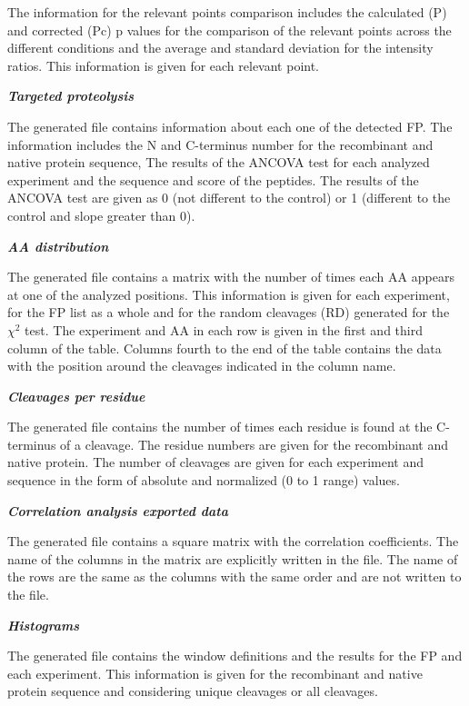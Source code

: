 The information for the relevant points comparison includes the calculated (P) and corrected (Pc) p values for the comparison of the relevant points across the different conditions and the average and standard deviation for the intensity ratios. This information is given for each relevant point.

\textit{\textbf{Targeted proteolysis}} 

The generated file contains information about each one of the detected FP. The information includes the N and C-terminus number for the recombinant and native protein sequence, The results of the ANCOVA test for each analyzed experiment and the sequence and score of the peptides. The results of the ANCOVA test are given as 0 (not different to the control) or 1 (different to the control and slope greater than 0).

\textit{\textbf{AA distribution}}

The generated file contains a matrix with the number of times each AA appears at one of the analyzed positions. This information is given for each experiment, for the FP list as a whole and for the random cleavages (RD) generated for the $\chi^2$ test. The experiment and AA in each row is given in the first and third column of the table. Columns fourth to the end of the table contains the data with the position around the cleavages indicated in the column name.

\textit{\textbf{Cleavages per residue}}

The generated file contains the number of times each residue is found at the C-terminus of a cleavage. The residue numbers are given for the recombinant and native protein. The number of cleavages are given for each experiment and sequence in the form of absolute and normalized (0 to 1 range) values.

\textit{\textbf{Correlation analysis exported data}} 

The generated file contains a square matrix with the correlation coefficients. The name of the columns in the matrix are explicitly written in the file. The name of the rows are the same as the columns with the same order and are not written to the file.

\textbf{\textit{Histograms}}

The generated file contains the window definitions and the results for the FP and each experiment. This information is given for the recombinant and native protein sequence and considering unique cleavages or all cleavages.

